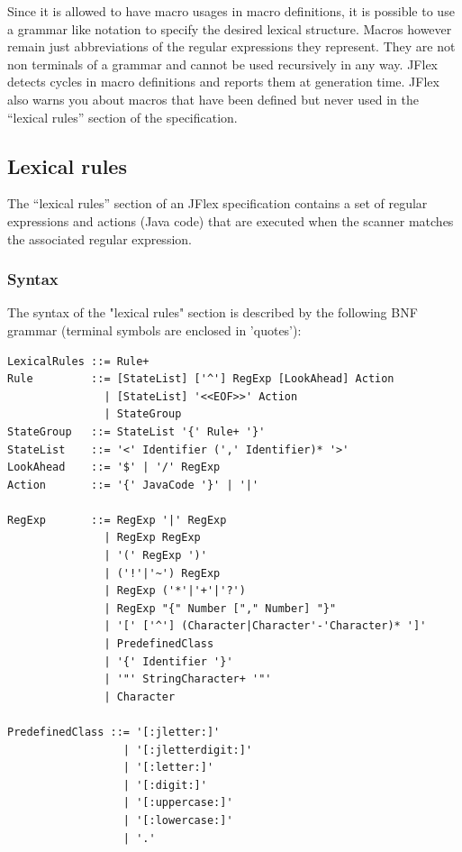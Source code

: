 \documentclass[11pt]{scrartcl}
\begin{document}
Since it is allowed to have macro usages in macro definitions, it is
possible to use a grammar like notation to specify the desired lexical
structure. Macros however remain just abbreviations of the regular expressions
they represent. They are not non terminals of a grammar and cannot be used
recursively in any way. JFlex detects cycles in macro definitions and reports
them at generation time. JFlex also warns you about macros that have been
defined but never used in the ``lexical rules'' section of the specification.
  
\subsection{Lexical rules\label{LexRules}}
The ``lexical rules'' section of an JFlex specification contains a set of
regular expressions and actions (Java code) that are executed when the
scanner matches the associated regular expression.
 
\subsubsection{Syntax\label{Grammar}}
The syntax of the "lexical rules" section is described by the following
BNF grammar (terminal symbols are enclosed in 'quotes'):

\begin{verbatim}
LexicalRules ::= Rule+ 
Rule         ::= [StateList] ['^'] RegExp [LookAhead] Action 
               | [StateList] '<<EOF>>' Action
               | StateGroup 
StateGroup   ::= StateList '{' Rule+ '}' 
StateList    ::= '<' Identifier (',' Identifier)* '>' 
LookAhead    ::= '$' | '/' RegExp
Action       ::= '{' JavaCode '}' | '|'

RegExp       ::= RegExp '|' RegExp 
               | RegExp RegExp 
               | '(' RegExp ')'
               | ('!'|'~') RegExp
               | RegExp ('*'|'+'|'?')
               | RegExp "{" Number ["," Number] "}" 
               | '[' ['^'] (Character|Character'-'Character)* ']' 
               | PredefinedClass 
               | '{' Identifier '}' 
               | '"' StringCharacter+ '"' 
               | Character 

PredefinedClass ::= '[:jletter:]' 
                  | '[:jletterdigit:]' 
                  | '[:letter:]' 
                  | '[:digit:]' 
                  | '[:uppercase:]' 
                  | '[:lowercase:]' 
                  | '.' 
\end{verbatim}
\end{document}
